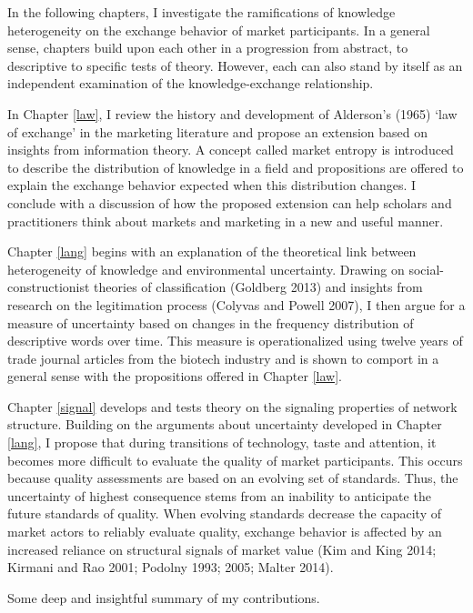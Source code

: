 In the following chapters, I investigate the ramifications of knowledge heterogeneity on the exchange behavior of market participants. In a general sense, chapters build upon each other in a progression from abstract, to descriptive to specific tests of theory. However, each can also stand by itself as an independent examination of the knowledge-exchange relationship. 

In Chapter \ref{law}, I review the history and development of Alderson's (1965) `law of exchange' in the marketing literature and propose an extension based on insights from information theory. A concept called market entropy is introduced to describe the distribution of knowledge in a field and propositions are offered to explain the exchange behavior expected when this distribution changes. I conclude with a discussion of how the proposed extension can help scholars and practitioners think about markets and marketing in a new and useful manner. 

Chapter \ref{lang} begins with an explanation of the theoretical link between heterogeneity of knowledge and environmental uncertainty. Drawing on social-constructionist theories of classification (Goldberg 2013) and insights from research on the legitimation process (Colyvas and Powell 2007), I then argue for a measure of uncertainty based on changes in the frequency distribution of descriptive words over time. This measure is operationalized using twelve years of trade journal articles from the biotech industry and is shown to comport in a general sense with the propositions offered in Chapter \ref{law}. 

Chapter \ref{signal} develops and tests theory on the signaling properties of network structure. Building on the arguments about uncertainty developed in Chapter \ref{lang}, I propose that during transitions of technology, taste and attention, it becomes more difficult to evaluate the quality of market participants. This occurs because quality assessments are based on an evolving set of standards. Thus, the uncertainty of highest consequence stems from an inability to anticipate the future standards of quality. When evolving standards decrease the capacity of market actors to reliably evaluate quality, exchange behavior is affected by an increased reliance on structural signals of market value (Kim and King 2014; Kirmani and Rao 2001; Podolny 1993; 2005; Malter 2014). 

Some deep and insightful summary of my contributions.